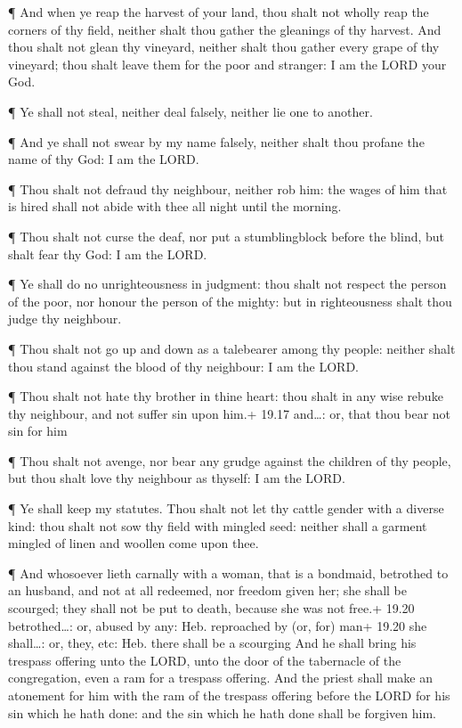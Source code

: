  ¶ And when ye reap the harvest of your land, thou shalt not
wholly reap the corners of thy field, neither shalt thou gather the
gleanings of thy harvest.  And thou shalt not glean thy
vineyard, neither shalt thou gather every grape of thy vineyard; thou
shalt leave them for the poor and stranger: I am the LORD your God.

 ¶ Ye shall not steal, neither deal falsely, neither lie
one to another.

 ¶ And ye shall not swear by my name falsely, neither shalt
thou profane the name of thy God: I am the LORD.

 ¶ Thou shalt not defraud thy neighbour, neither rob him:
the wages of him that is hired shall not abide with thee all night until
the morning.

 ¶ Thou shalt not curse the deaf, nor put a stumblingblock
before the blind, but shalt fear thy God: I am the LORD.

 ¶ Ye shall do no unrighteousness in judgment: thou shalt
not respect the person of the poor, nor honour the person of the mighty:
but in righteousness shalt thou judge thy neighbour.

 ¶ Thou shalt not go up and down as a talebearer among thy
people: neither shalt thou stand against the blood of thy neighbour: I
am the LORD.

 ¶ Thou shalt not hate thy brother in thine heart: thou
shalt in any wise rebuke thy neighbour, and not suffer sin upon him.+
19.17 and\ldots: or, that thou bear not sin for him

 ¶ Thou shalt not avenge, nor bear any grudge against the
children of thy people, but thou shalt love thy neighbour as thyself: I
am the LORD.

 ¶ Ye shall keep my statutes. Thou shalt not let thy cattle
gender with a diverse kind: thou shalt not sow thy field with mingled
seed: neither shall a garment mingled of linen and woollen come upon
thee.

 ¶ And whosoever lieth carnally with a woman, that is a
bondmaid, betrothed to an husband, and not at all redeemed, nor freedom
given her; she shall be scourged; they shall not be put to death,
because she was not free.+ 19.20 betrothed\ldots: or, abused by any:
Heb. reproached by (or, for) man+ 19.20 she shall\ldots: or, they, etc:
Heb. there shall be a scourging  And he shall bring his
trespass offering unto the LORD, unto the door of the tabernacle of the
congregation, even a ram for a trespass offering.  And the
priest shall make an atonement for him with the ram of the trespass
offering before the LORD for his sin which he hath done: and the sin
which he hath done shall be forgiven him.

